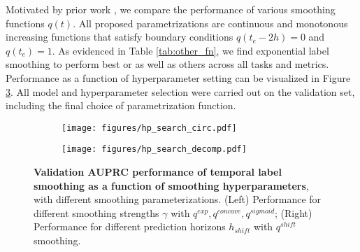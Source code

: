 \documentclass[nohyperref]{article}
\begin{document}
Motivated by prior work \citep{tomavsev2019, cox1972}, we compare the performance of various smoothing functions $ q(t)$. All proposed parametrizations are continuous and monotonous increasing functions that satisfy boundary conditions $q( t_e - 2h) = 0$ and $q( t_e)=1$. As evidenced in Table \ref{tab:other_fn}, we find exponential label smoothing to perform best or as well as others across all tasks and metrics. {Performance as a function of hyperparameter setting can be visualized in Figure \ref{fig:smoothing_hyperparams}. All model and hyperparameter selection were carried out on the validation set, including the final choice of parametrization function.
}


\begin{figure}[h]
\centering
\begin{subfigure}[b]{0.9\textwidth}
  \centering
  \texttt{[image: figures/hp\_search\_circ.pdf]}
  \caption{} 
  \label{fig:smoothing_hypers_circ}
\end{subfigure}
\vspace{0.5em}
\begin{subfigure}[b]{0.9\textwidth}
  \centering
    \texttt{[image: figures/hp\_search\_decomp.pdf]}
  \caption{} 
  \label{fig:smoothing_hypers_decomp}
\end{subfigure}
\caption{{\textbf{Validation AUPRC performance of temporal label smoothing as a function of smoothing hyperparameters}, with different smoothing parameterizations. (Left) Performance for different smoothing strengths $\gamma$ with $q^{exp},q^{concave},q^{sigmoid}$; (Right)  Performance for different prediction horizons $h_{shift}$ with $q^{shift}$ smoothing.}} \label{fig:smoothing_hyperparams}
\end{figure}
\begin{comment}
    \vspace{0.5em}
\begin{subfigure}[b]{0.9\textwidth}
  \centering
    \texttt{[image: figures/hp\_search\_resp.pdf]}
  \caption{\centering {Respiratory failure.}} 
  \label{fig:smoothing_hypers_resp}
\end{subfigure}
\end{comment}
\end{document}
